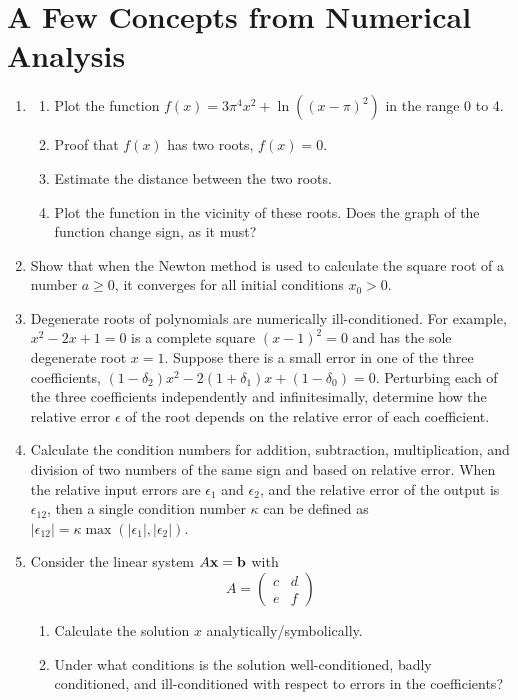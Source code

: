 \documentclass{article}
\begin{document}
\clearpage
\section{A Few Concepts from Numerical Analysis}

\begin{enumerate}
\item \label{prbl:invisibleroot}
\begin{enumerate} \setlength{\itemsep}{0pt}
\item Plot the function  $f(x) = 3 \pi^4 x^2+\ln((x-\pi)^2)$ in the range 0 to 4.   %
\item Proof that $f(x)$ has two roots, $f(x)=0$.
\item Estimate the distance between the two roots. 
\item Plot the function in the vicinity of these roots.  Does the graph of the function change sign, as it must?
\end{enumerate}

\item Show that when the Newton method is used to calculate the square root of a number $a \geq 0$, it converges for all initial conditions $x_0 > 0$. 

\item
Degenerate roots of polynomials are numerically ill-conditioned.
For example, $x^2-2x+1=0$ is a complete square $(x-1)^2=0$ and has the sole degenerate root $x=1$.  
Suppose there is a small error in one of the three coefficients, $(1-\delta_2) x^2-2(1+\delta_1) x+(1-\delta_0)=0$.
Perturbing each of the three coefficients independently and infinitesimally, determine how the relative error $\epsilon$ of the root depends on the relative error of each coefficient. 

\item \label{prbl:cond4elemop}
  Calculate the condition numbers for addition, subtraction, multiplication, and division of two numbers of the same sign and based on relative error. When the relative input errors are $\epsilon_1$ and $\epsilon_2$, and the relative error of the output is $\epsilon_{12}$, then a single condition number $\kappa$ can be defined as $|\epsilon_{12}| = \kappa \max(|\epsilon_1|,|\epsilon_2|)$.

\item Consider the linear system $A{\bf x} = \bf b$ with
  \[
  A = \left( \begin{array}{cc} c & d \\
    e & f \end{array} \right)
  \]
    \begin{enumerate} \setlength{\itemsep}{0pt}
    \item Calculate the solution $x$ analytically/symbolically.
    \item Under what conditions is the solution well-conditioned, badly conditioned, and ill-conditioned
      with respect to errors in the coefficients?
    \end{enumerate}
  
\end{enumerate}
\end{document}
